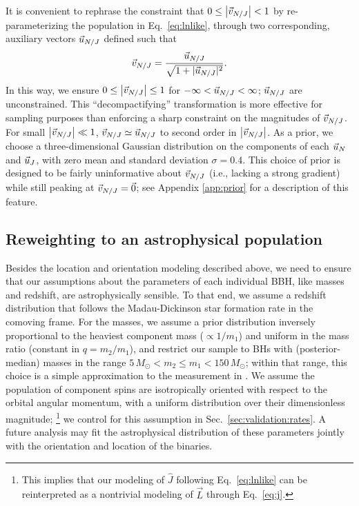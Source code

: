 \documentclass[twocolumn,twocolappendix,linenumbers]{aastex631}
\begin{document}
It is convenient to rephrase the constraint that $0 \leq \left| \vec{v}_{N/J} \right| <
1$ by re-parameterizing the population in Eq.~\eqref{eq:lnlike}, through two
corresponding, auxiliary vectors $\vec{u}_{N/J}$ defined such that
\begin{equation}
\dip{N/J} = \frac{\dipraw{N/J} }{\sqrt{1 + |\dipraw{N/J}|^2}} .
\end{equation}
In this way, we ensure $0 \leq \left| \vec{v}_{N/J} \right| \leq 1$ for $-\infty <
\vec{u}_{N/J} < \infty$; $\vec{u}_{N/J}$ are unconstrained.  This ``decompactifying'' transformation
is more effective for sampling purposes than enforcing a sharp constraint on the
magnitudes of $\vec{v}_{N/J}$. For small $\left| \vec{v}_{N/J} \right| \ll 1$, $\vec{v}_{N/J}
\simeq \vec{u}_{N/J}$ to second order in $\left| \vec{v}_{N/J} \right|$. As a prior, we choose a three-dimensional Gaussian distribution on the components of
each $\vec{u}_{N}$ and $\vec{u}_{J}$, with zero mean and standard deviation
$\sigma = 0.4$. This choice of prior is designed to be fairly uninformative about
$\vec{v}_{N/J}$ (i.e., lacking a strong gradient) while still peaking at $\vec{v}_{N/J} = \vec{0}$; see Appendix
\ref{app:prior} for a description of this feature.

\subsection{Reweighting to an astrophysical population}
\label{sec:reweight}

Besides the location and orientation modeling described above, we need to ensure that our assumptions about the parameters of each individual \ac{BBH}, like masses and redshift, are astrophysically sensible.
To that end, we assume a redshift distribution that follows the Madau-Dickinson star formation rate \citep{Madau:2014bja} in the comoving frame.
For the masses, we assume a prior distribution inversely proportional to the heaviest component mass ($\propto 1/m_1$) and uniform in the mass ratio (constant in $q = m_2/m_1$), and restrict our sample to \acp{BH} with (posterior-median) masses in the range $5 \, M_\odot < m_2 \leq m_1 < 150 \, M_\odot$; within that range, this choice is a simple approximation to the measurement in \citet{LIGOScientific:2021psn}.
We assume the population of component spins are isotropically oriented with respect to the orbital angular momentum, with a uniform distribution over their dimensionless magnitude;%
\footnote{This implies that our modeling of $\hat{J}$ following Eq.~\eqref{eq:lnlike} can be reinterpreted as a nontrivial modeling of $\vec{L}$ through Eq.~\eqref{eq:j}.}
we control for this assumption in Sec.~\ref{sec:validation:rates}.
A future analysis may fit the astrophysical distribution of these parameters jointly with the orientation and location of the binaries. 
\end{document}
